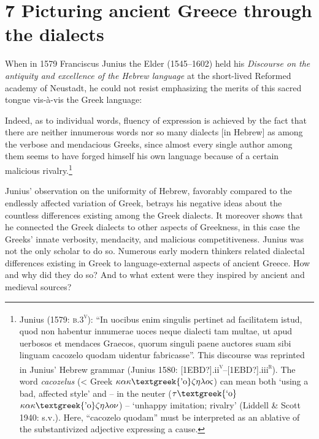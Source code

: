 \clearpage\clearpage\section[7 Picturing ancient Greece through the dialects]{\textsc{7 }Picturing ancient Greece through the dialects}
\hypertarget{Toc19704849}{}\begin{styleStandard}
When in 1579 Franciscus Junius the Elder (1545–1602) held his \textit{Discourse on the antiquity and excellence of the Hebrew language }at the short-lived Reformed academy of Neustadt, he could not resist emphasizing the merits of this sacred tongue vis-à-vis the Greek language:
\end{styleStandard}

\begin{styleQuote}
Indeed, as to individual words, fluency of expression is achieved by the fact that there are neither innumerous words nor so many dialects [in Hebrew] as among the verbose and mendacious Greeks, since almost every single author among them seems to have forged himself his own language because of a certain malicious rivalry.\footnote{ Junius (1579: \textsc{b.3}\textsc{\textsuperscript{v}}): “In uocibus enim singulis pertinet ad facilitatem istud, quod non habentur innumerae uoces neque dialecti tam multae, ut apud uerbosos et mendaces Graecos, quorum singuli paene auctores suam sibi linguam cacozelo quodam uidentur fabricasse”. This discourse was reprinted in Junius’ Hebrew grammar (Junius 1580: [1EBD?].ii\textsc{\textsuperscript{v}}–[1EBD?].iii\textsc{\textsuperscript{r}}). The word \textit{cacozelus} ({\textless} Greek $\kappa \alpha \kappa \text{\textgreek{'o}}\zeta \eta \lambda o\varsigma $) can mean both ‘using a bad, affected style’ and – in the neuter ($\tau \text{\textgreek{`o}}$ $\kappa \alpha \kappa \text{\textgreek{'o}}\zeta \eta \lambda o\nu $) – ‘unhappy imitation; rivalry’ (Liddell \& Scott 1940: s.v\textit{.}). Here, “cacozelo quodam” must be interpreted as an ablative of the substantivized adjective expressing a cause.}
\end{styleQuote}

\begin{styleStandard}
Junius’ observation on the uniformity of Hebrew, favorably compared to the endlessly affected variation of Greek, betrays his negative ideas about the countless differences existing among the Greek dialects. It moreover shows that he connected the Greek dialects to other aspects of Greekness, in this case the Greeks’ innate verbosity, mendacity, and malicious competitiveness. Junius was not the only scholar to do so. Numerous early modern thinkers related dialectal differences existing in Greek to language-external aspects of ancient Greece. How and why did they do so? And to what extent were they inspired by ancient and medieval sources?
\end{styleStandard}

